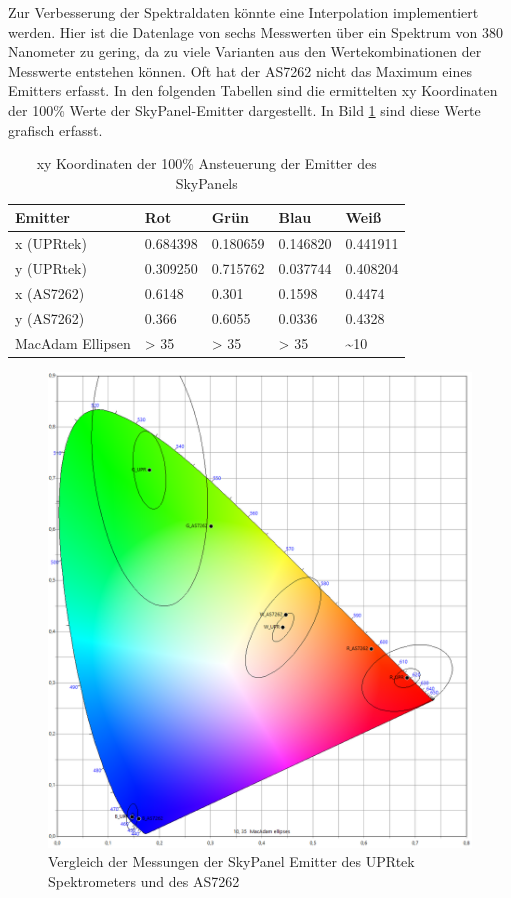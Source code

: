 \documentclass[11pt]{scrartcl}
\begin{document}
\noindent
Zur Verbesserung der Spektraldaten könnte eine Interpolation implementiert werden. Hier ist die Datenlage von sechs Messwerten
über ein Spektrum von 380 Nanometer zu gering, da zu viele Varianten aus den Wertekombinationen der Messwerte entstehen
können. Oft hat der AS7262 nicht das Maximum eines Emitters erfasst. In den folgenden Tabellen sind die ermittelten xy
Koordinaten der 100\% Werte der SkyPanel-Emitter dargestellt. In Bild \ref{compareUPRtekAS7262} sind diese Werte grafisch erfasst.
\begin{table}[H]
    \begin{tabularx}{\textwidth}{|l|X|X|X|X|}
        \hline Emitter   & Rot      & Grün     & Blau     & Weiß\\\hline
        x (UPRtek)       & 0.684398 & 0.180659 & 0.146820 & 0.441911\\\hline
        y (UPRtek)       & 0.309250 & 0.715762 & 0.037744 & 0.408204\\\hline
        x (AS7262)       & 0.6148   & 0.301    & 0.1598   & 0.4474\\\hline
        y (AS7262)       & 0.366    & 0.6055   & 0.0336   & 0.4328\\\hline
        MacAdam Ellipsen & > 35     & > 35     & > 35     & \textasciitilde 10\\\hline
    \end{tabularx}
    \caption{xy Koordinaten der 100\% Ansteuerung der Emitter des SkyPanels}
\end{table}
\begin{figure}[H]
    \vspace{-5pt}
    \begin{center}
        \includegraphics[width=.93\textwidth]{images/macAdam/comparison_upr_as7262.png}
    \end{center}
    \vspace{-11pt}
    \caption{Vergleich der Messungen der SkyPanel Emitter des UPRtek Spektrometers und des AS7262} \label{compareUPRtekAS7262}
\end{figure}
\end{document}
